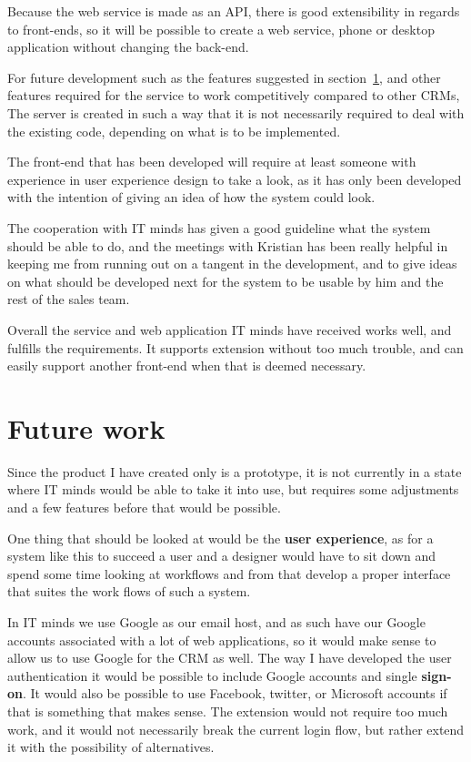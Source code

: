 Because the web service is made as an API, there is good extensibility in regards
to front-ends, so it will be possible to create a web service, phone or desktop
application without changing the back-end.

For future development such as the features suggested in
section~\ref{sec:future_work}, and other features required for the service to
work competitively compared to other CRMs, The server is created in such a way
that it is not necessarily required to deal with the existing code, depending on
what is to be implemented.

The front-end that has been developed will require at least someone with
experience in user experience design to take a look, as it has only been
developed with the intention of giving an idea of how the system could look.

The cooperation with IT minds has given a good guideline what the system should
be able to do, and the meetings with Kristian has been really helpful in keeping
me from running out on a tangent in the development, and to give ideas on what
should be developed next for the system to be usable by him and the rest of the
sales team.

Overall the service and web application IT minds have received works well, and
fulfills the requirements. It supports extension without too much trouble, and
can easily support another front-end when that is deemed necessary.

\section{Future work}
\label{sec:future_work}
Since the product I have created only is a prototype, it is not currently in a
state where IT minds would be able to take it into use, but requires some
adjustments and a few features before that would be possible.

One thing that should be looked at would be the \textbf{user experience}, as for a system
like this to succeed a user and a designer would have to sit down and spend
some time looking at workflows and from that develop a proper interface that
suites the work flows of such a system.

In IT minds we use Google as our email host, and as such have our Google
accounts associated with a lot of web applications, so it would make sense to
allow us to use Google for the CRM as well. The way I have developed the user
authentication it would be possible to include Google accounts and single
\textbf{sign-on}. It would also be possible to use Facebook, twitter, or Microsoft accounts if that
is something that makes sense. The extension would not require too much work,
and it would not necessarily break the current login flow, but rather extend it
with the possibility of alternatives.

